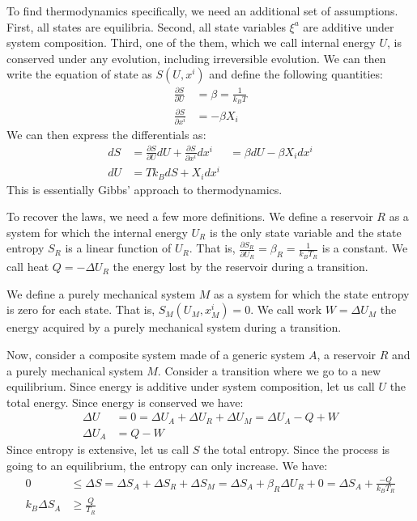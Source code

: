 \documentclass[11pt,letterpaper,fleqn]{memoir} %
\begin{document}
To find thermodynamics specifically, we need an additional set of assumptions. First, all states are equilibria. Second, all state variables $\xi^a$ are additive under system composition. Third, one of the them, which we call internal energy $U$, is conserved under any evolution, including irreversible evolution. We can then write the equation of state as $S(U, x^i)$ and define the following quantities:
\begin{equation}
\begin{aligned}
\frac{\partial S}{\partial U} &= \beta = \frac{1}{k_B T} \\
\frac{\partial S}{\partial x^i} &= - \beta X_i
\end{aligned}
\end{equation}
We can then express the differentials as:
\begin{equation}
\begin{aligned}
dS &= \frac{\partial S}{\partial U} dU + \frac{\partial S}{\partial x^i} dx^i &= \beta dU - \beta X_i dx^i \\
dU & = T k_B dS + X_i dx^i
\end{aligned}
\end{equation}
This is essentially Gibbs' approach to thermodynamics.

To recover the laws, we need a few more definitions. We define a reservoir $R$ as a system for which the internal energy $U_R$ is the only state variable and the state entropy $S_R$ is a linear function of $U_R$. That is, $\frac{\partial S_R}{\partial U_R} = \beta_R = \frac{1}{k_B T_R}$ is a constant. We call heat $Q=-\Delta U_R$ the energy lost by the reservoir during a transition.

We define a purely mechanical system $M$ as a system for which the state entropy is zero for each state. That is, $S_M(U_M, x^i_M) = 0$. We call work $W = \Delta U_M$ the energy acquired by a purely mechanical system during a transition.

Now, consider a composite system made of a generic system $A$, a reservoir $R$ and a purely mechanical system $M$. Consider a transition where we go to a new equilibrium. Since energy is additive under system composition, let us call $U$ the total energy. Since energy is conserved we have:
\begin{equation}
\begin{aligned}
\Delta U &= 0 = \Delta U_A + \Delta U_R +\Delta U_M = \Delta U_A - Q + W \\
\Delta U_A &= Q - W
\end{aligned}
\end{equation}
Since entropy is extensive, let us call $S$ the total entropy. Since the process is going to an equilibrium, the entropy can only increase. We have:
\begin{equation}
\begin{aligned}
0 &\leq \Delta S = \Delta S_A + \Delta S_R +\Delta S_M = \Delta S_A + \beta_R \Delta U_R + 0 = \Delta S_A + \frac{-Q}{k_B T_R} \\
k_B \Delta S_A &\geq \frac{Q}{T_R}
\end{aligned}
\end{equation}
\end{document}
